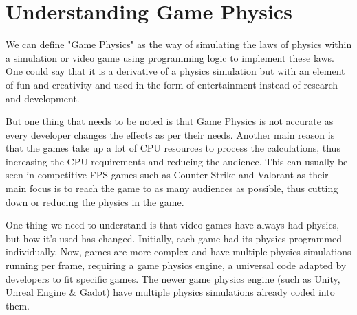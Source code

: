 \section{Understanding Game Physics}
We can define "Game Physics" as the way of simulating the laws of physics within a simulation or video game using programming logic to implement these laws. One could say that it is a derivative of a physics simulation but with an element of fun and creativity and used in the form of entertainment instead of research and development.

But one thing that needs to be noted is that Game Physics is not accurate as every developer changes the effects as per their needs. Another main reason is that the games take up a lot of CPU resources to process the calculations, thus increasing the CPU requirements and reducing the audience. This can usually be seen in competitive FPS games such as Counter-Strike and Valorant as their main focus is to reach the game to as many audiences as possible, thus cutting down or reducing the physics in the game.

One thing we need to understand is that video games have always had physics, but how it's used has changed. Initially, each game had its physics programmed individually. Now, games are more complex and have multiple physics simulations running per frame, requiring a game physics engine, a universal code adapted by developers to fit specific games. The newer game physics engine (such as Unity, Unreal Engine \& Gadot) have multiple physics simulations already coded into them.